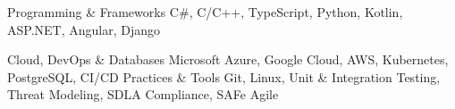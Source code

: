 

\begin{cvskills}

  \cvskill
    {Programming \& Frameworks} %
    {C\#, C/C++, TypeScript, Python, Kotlin, ASP.NET, Angular, Django} %

  \cvskill
    {Cloud, DevOps \& Databases} %
    {Microsoft Azure, Google Cloud, AWS, Kubernetes, PostgreSQL, CI/CD } %
  \cvskill
    {Practices \& Tools} %
    {Git, Linux, Unit \& Integration Testing, Threat Modeling, SDLA Compliance, SAFe Agile} %

\end{cvskills}
